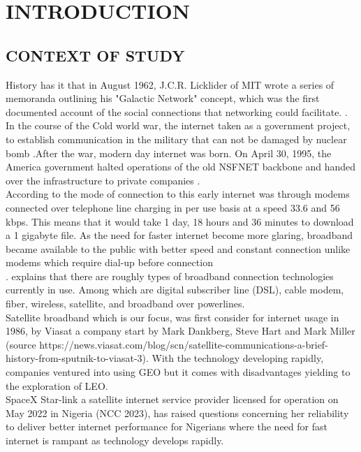 \chapter{INTRODUCTION}
\section{CONTEXT OF STUDY}
History has it that in August 1962, J.C.R. Licklider of MIT wrote a series of memoranda outlining his "Galactic Network" concept, which was the first documented account of the social connections that networking could facilitate. \cite{leinerbrief}. In the course of the Cold world war, the internet taken as a government project, to establish communication in the military that can not be damaged by nuclear bomb \cite{abbate2000inventing}.After the war, modern day internet was born. On April 30, 1995, the America government halted operations of the old NSFNET backbone and handed over the infrastructure to private companies \cite{abbate2000inventing}.\\
	According to \cite{mack2020history} the mode of connection to this early internet was through modems connected over telephone line charging in per use basis at a speed 33.6 and 56 kbps. This means that it would take 1 day, 18 hours and 36 minutes to download a 1 gigabyte file. As the need for faster internet become more glaring, broadband became available to the public with better speed and constant connection unlike modems which require dial-up before connection\\.
	\cite{moeyaert2011network} explains that there are roughly types of broadband connection technologies currently in use. Among which are digital subscriber line (DSL), cable modem, fiber, wireless, satellite, and broadband over powerlines.\\
	Satellite broadband which is our focus, was first consider for internet usage in 1986, by Viasat a company start by Mark Dankberg, Steve Hart and Mark Miller (source https://news.viasat.com/blog/scn/satellite-communications-a-brief-history-from-sputnik-to-viasat-3). With the technology developing rapidly, companies ventured into using GEO but it comes with disadvantages yielding to the exploration of LEO.\\
	SpaceX Star-link a satellite internet service provider licensed for operation on May 2022 in Nigeria (NCC 2023), has raised questions concerning her reliability to deliver better internet performance for Nigerians where the need for fast internet is rampant as technology develops rapidly.
